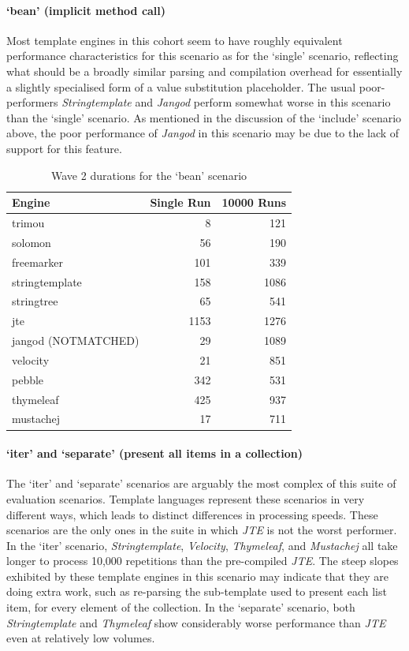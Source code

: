 \paragraph{`bean' (implicit method call)}

Most template engines in this cohort seem to have roughly equivalent performance characteristics for this scenario as for the `single' scenario, reflecting what should be a broadly similar parsing and compilation overhead for essentially a slightly specialised form of a value substitution placeholder. The usual poor-performers \emph{Stringtemplate} and \emph{Jangod} perform somewhat worse in this scenario than the `single' scenario. As mentioned in the discussion of the `include' scenario above, the poor performance of \emph{Jangod} in this scenario may be due to the lack of support for this feature.

\begin{table}[ht!]
\centering
\begin{tabular}{lrr}
\textbf{Engine} & \textbf{Single Run} & \textbf{10000 Runs} \\
\hline
trimou & 8 & 121 \\
solomon & 56 & 190 \\
freemarker & 101 & 339 \\
stringtemplate & 158 & 1086 \\
stringtree & 65 & 541 \\
jte & 1153 & 1276 \\
jangod (NOTMATCHED) & 29 & 1089 \\
velocity & 21 & 851 \\
pebble & 342 & 531 \\
thymeleaf & 425 & 937 \\
mustachej & 17 & 711 \\
\end{tabular}
\caption{Wave 2 durations for the `bean' scenario\label{w2:results:bean}}
\end{table}

\paragraph{`iter' and `separate' (present all items in a collection)}

The `iter' and `separate' scenarios are arguably the most complex of this suite of evaluation scenarios. Template languages represent these scenarios in very different ways, which leads to distinct differences in processing speeds. These scenarios are the only ones in the suite in which \emph{JTE} is not the worst performer.  In the `iter' scenario, \emph{Stringtemplate}, \emph{Velocity}, \emph{Thymeleaf}, and \emph{Mustachej} all take longer to process 10,000 repetitions than the pre-compiled \emph{JTE}. The steep slopes exhibited by these template engines in this scenario may indicate that they are doing extra work, such as re-parsing the sub-template used to present each list item, for every element of the collection. In the `separate' scenario, both \emph{Stringtemplate} and \emph{Thymeleaf} show considerably worse performance than \emph{JTE} even at relatively low volumes.

